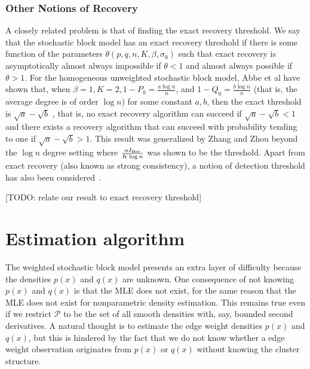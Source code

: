 \documentclass{article}
\begin{document}
\subsubsection{Other Notions of Recovery}

A closely related problem is that of finding the exact recovery threshold. We say that the stochastic block model has an exact recovery threshold if there is some function of the parameters $\theta(p, q, n, K, \beta, \sigma_0)$ such that exact recovery is asymptotically almost always impossible if $\theta < 1$ and almost always possible if $\theta > 1$. For the homogeneous unweighted stochastic block model, Abbe et al \cite{abbe2014exact} have shown that, when $\beta=1, K=2, 1 - P_0 = \frac{a \log n}{n}$, and $1 - Q_0 = \frac{b \log n}{n}$  (that is, the average degree is of order $\log n$) for some constant $a,b$, then the exact threshold is $\sqrt{a} - \sqrt{b}$ , that is, no exact recovery algorithm can succeed if $\sqrt{a} - \sqrt{b} < 1$ and there exists a recovery algorithm that can succeed with probability tending to one if $\sqrt{a} - \sqrt{b} > 1$.  This result was generalized by Zhang and Zhou \cite{zhangminimax} beyond the $\log n$ degree setting where $ \frac{n I_{\textrm{Ber}}}{K \log n}$ was shown to be the threshold. Apart from exact recovery (also known as strong consistency), a notion of detection threshold has also been considered~\cite{MosEtal14}. 

[TODO: relate our result to exact recovery threshold]





\section{Estimation algorithm}
\label{sec:method}

The weighted stochastic block model presents an extra layer of difficulty because the densities $p(x)$ and $q(x)$ are unknown. One consequence of not knowing $p(x)$ and $q(x)$ is that the MLE does not exist, for the same reason that the MLE does not exist for nonparametric density estimation. This remains true even if we restrict $\mathcal{P}$ to be the set of all smooth densities with, say, bounded second derivatives. A natural thought is to estimate the edge weight densities $p(x)$ and $q(x)$, but this is hindered by the fact that we do not know whether a edge weight observation originates from $p(x)$ or $q(x)$ without knowing the cluster structure.
\end{document}
